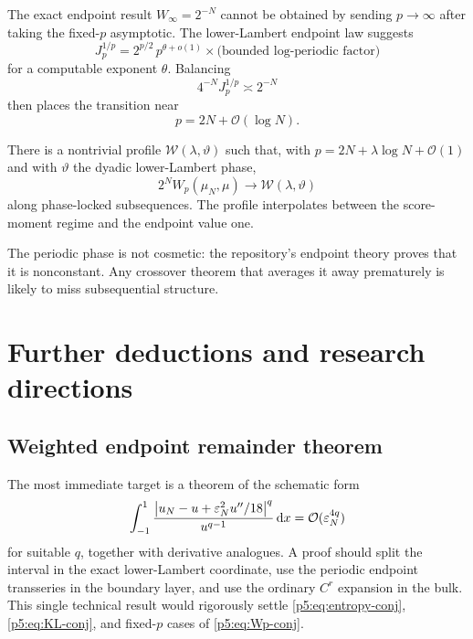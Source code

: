\documentclass[11pt,oneside]{article}
\numberwithin{equation}{section}
\theoremstyle{definition}
\theoremstyle{remark}
\newcommand{\dd}{\,\mathrm d}
\newcommand{\bigO}{\mathcal O}
\newcommand{\smallo}{o}
\begin{document}
The exact endpoint result $W_\infty=2^{-N}$ cannot be obtained by sending $p\to\infty$ after taking the fixed-$p$ asymptotic.  The lower-Lambert endpoint law suggests
\begin{equation}
 J_p^{1/p}=2^{p/2}\,p^{\theta+\smallo(1)}
 \times\bigl(\text{bounded log-periodic factor}\bigr)
 \label{p5:eq:Jp-growth}
\end{equation}
for a computable exponent $\theta$.  Balancing
\[
 4^{-N}J_p^{1/p}\asymp2^{-N}
\]
then places the transition near
\begin{equation}
 p=2N+\bigO(\log N).
 \label{p5:eq:crossover}
\end{equation}

\begin{conjecture}
There is a nontrivial profile $\mathcal W(\lambda,\vartheta)$ such that, with
$p=2N+\lambda\log N+\bigO(1)$ and with $\vartheta$ the dyadic lower-Lambert phase,
\begin{equation}
 2^N W_p(\mu_N,\mu)\longrightarrow\mathcal W(\lambda,\vartheta)
 \label{p5:eq:crossover-profile}
\end{equation}
along phase-locked subsequences.  The profile interpolates between the score-moment regime and the endpoint value one.
\end{conjecture}

The periodic phase is not cosmetic: the repository's endpoint theory proves that it is nonconstant.  Any crossover theorem that averages it away prematurely is likely to miss subsequential structure.

\section{Further deductions and research directions}
\label{p5:sec:future}

\subsection{Weighted endpoint remainder theorem}

The most immediate target is a theorem of the schematic form
\begin{equation}
 \int_{-1}^{1}
 \frac{\abs{u_N-u+\eps_N^2u''/18}^q}{u^{q-1}}
 \dd x
 =\bigO(\eps_N^{4q})
 \label{p5:eq:weighted-remainder-goal}
\end{equation}
for suitable $q$, together with derivative analogues.  A proof should split the interval in the exact lower-Lambert coordinate, use the periodic endpoint transseries in the boundary layer, and use the ordinary $C^r$ expansion in the bulk.  This single technical result would rigorously settle \eqref{p5:eq:entropy-conj}, \eqref{p5:eq:KL-conj}, and fixed-$p$ cases of \eqref{p5:eq:Wp-conj}.
\end{document}
